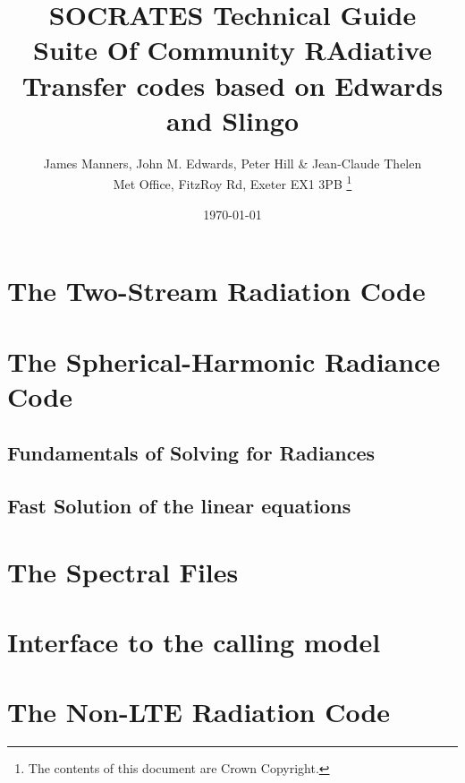 \documentclass[11pt,a4paper,english,twoside,openright]{book}
\begin{document}

\pagestyle{empty}

\newcommand{\um}{$\mu$m}

\newcommand{\bx}{\mathbf{x}}
\newcommand{\bn}{\mathbf{n}}
\newcommand{\bnp}{\mathbf{n}'}

\title{SOCRATES Technical Guide\\
Suite Of Community RAdiative Transfer codes based on Edwards and Slingo}
\date{\today}

\author{James Manners, John M. Edwards, Peter Hill \& Jean-Claude Thelen\\
Met Office, FitzRoy Rd, Exeter EX1 3PB
\thanks{
 The contents of this document are Crown Copyright.
}}
\maketitle

\tableofcontents

\clearpage

\pagestyle{fancy}
\latex{
\fancyhf{}
\fancyhead[LE,RO]{\thepage}
\fancyhead[LO]{\nouppercase{\rightmark}}
\fancyhead[RE]{\nouppercase{\leftmark}}
}

\chapter{The Two-Stream Radiation Code}
\label{sec:twostream}


\chapter{The Spherical-Harmonic Radiance Code}
\label{sec:radiance}
\section{Fundamentals of Solving for Radiances}

\section{Fast Solution of the linear equations}


\chapter{The Spectral Files}
\label{sec:spec}
 
 
 

\chapter{Interface to the calling model}
\label{sec:interface}


\chapter{The Non-LTE Radiation Code}
\label{sec:um_nlte_code_desc}




\end{document}

